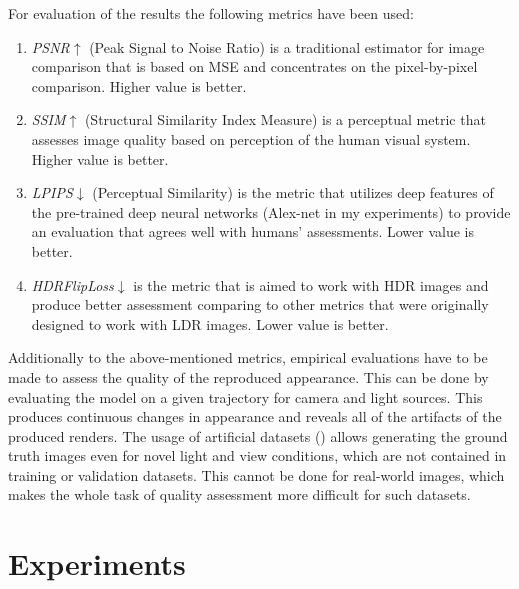 For evaluation of the results the following metrics have been used:
\begin{enumerate}
    \item \textit{PSNR}$\uparrow$ \cite{hore2010image} (Peak Signal to Noise Ratio) is a traditional estimator for image comparison
    that is based on MSE and concentrates on the pixel-by-pixel comparison.
    Higher value is better.
    \item \textit{SSIM}$\uparrow$ \cite{zhou2004image, nilsson2020understanding, hore2010image} (Structural Similarity Index Measure) is a perceptual metric
    that assesses image quality based on perception of the human visual system.
    Higher value is better.
    \item \textit{LPIPS}$\downarrow$ \cite{zhang2018perceptual} (Perceptual Similarity) is the metric
    that utilizes deep features of the pre-trained deep neural networks (Alex-net \cite{krizhevsky2012imagenet} in my experiments)
    to provide an evaluation that agrees well with humans' assessments.
    Lower value is better.
    \item \textit{HDRFlipLoss}$\downarrow$ \cite{theisel2021hdrflip, andersson2020flip} is the metric
    that is aimed to work with HDR images and produce better assessment comparing to other metrics
    that were originally designed to work with LDR images.
    Lower value is better.
\end{enumerate}

Additionally to the above-mentioned metrics, empirical evaluations have to be made
to assess the quality of the reproduced appearance.
This can be done by evaluating the model on a given trajectory for camera and light sources.
This produces continuous changes in appearance and reveals all of the artifacts of the produced renders.
The usage of artificial datasets () allows generating the ground truth images
even for novel light and view conditions, which are not contained in training or validation datasets.
This cannot be done for real-world images, which makes the whole task of quality assessment more difficult for such datasets.


\section{Experiments}


